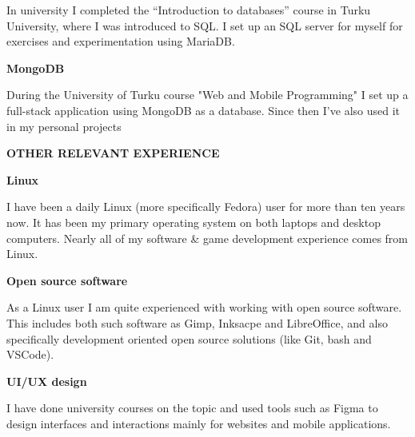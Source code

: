 \documentclass{article}
\begin{document}
\noindent In university I completed the “Introduction to databases” course in 
Turku University, where I was introduced to SQL. I set up an SQL server for 
myself for exercises and experimentation using MariaDB.

\vspace{0.5cm}
\textbf{\large MongoDB}
\vspace{0.5cm}

\noindent During the University of Turku course "Web and Mobile Programming" I 
set up a full-stack application using MongoDB as a database. Since then I've 
also used it in my personal projects

\vspace{1cm}
\textbf{\LARGE OTHER RELEVANT EXPERIENCE}
\vspace{0.5cm}

\textbf{\large Linux}
\vspace{0.5cm}

\noindent I have been a daily Linux (more specifically Fedora) user for more 
than ten years now. It has been my primary operating system on both laptops 
and desktop computers. Nearly all of my software & game development 
experience comes from Linux.

\vspace{0.5cm}
\textbf{\large Open source software}
\vspace{0.5cm}

\noindent As a Linux user I am quite experienced with working with open 
source software. This includes both such software as Gimp, Inksacpe and 
LibreOffice, and also specifically development oriented open source solutions 
(like Git, bash and VSCode).

\vspace{0.5cm}
\textbf{\large UI/UX design}
\vspace{0.5cm}

\noindent I have done university courses on the topic and used tools such as 
Figma to design interfaces and interactions mainly for websites and mobile 
applications.
\end{document}
